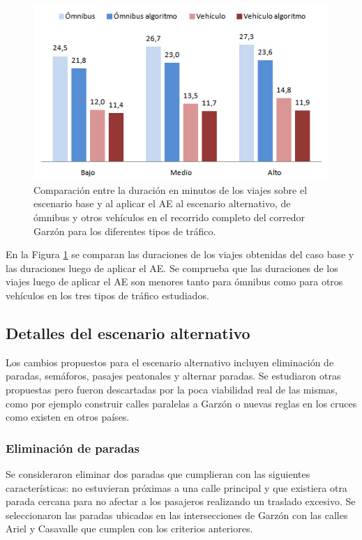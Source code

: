 \begin{figure}[H]
	\centering
	\includegraphics[width=0.8\linewidth]{Figures/duracion_viajes}
	\caption[Comparación de la duración en minutos de los viajes sobre el escenario base y al aplicar el algoritmo evolutivo.]{Comparación entre la duración en minutos de los viajes sobre el escenario base y al aplicar el AE al escenario alternativo, de ómnibus y otros vehículos en el recorrido completo del corredor Garzón para los diferentes tipos de tráfico.}
	\label{fig:duracion_viajes}
\end{figure}

En la Figura \ref{fig:duracion_viajes} se comparan las duraciones de los viajes obtenidas del caso base y las duraciones luego de aplicar el AE. Se comprueba que las duraciones de los viajes luego de aplicar el AE son menores tanto para ómnibus como para otros vehículos en los tres tipos de tráfico estudiados. 


\subsection{Detalles del escenario alternativo}
Los cambios propuestos para el escenario alternativo incluyen eliminación de paradas, semáforos, pasajes peatonales y alternar paradas. Se estudiaron otras propuestas pero fueron descartadas por la poca viabilidad real de las mismas, como por ejemplo construir calles paralelas a Garzón o nuevas reglas en los cruces como existen en otros países.

\subsubsection{Eliminación de paradas}
Se consideraron eliminar dos paradas que cumplieran con las siguientes características: no estuvieran próximas a una calle principal y que existiera otra parada cercana para no afectar a los pasajeros realizando un traslado excesivo. Se seleccionaron las paradas ubicadas en las intersecciones de Garzón con las calles Ariel y Casavalle que cumplen con los criterios anteriores.

